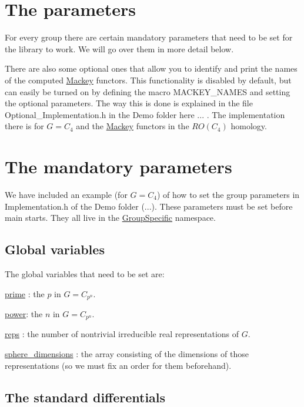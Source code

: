 \hypertarget{how_para}{}\section{The parameters}\label{how_para}

\begin{DoxyItemize}
\item For every group there are certain mandatory parameters that need to be set for the library to work. We will go over them in more detail below.
\item There are also some optional ones that allow you to identify and print the names of the computed \hyperlink{namespaceMackey}{Mackey} functors. This functionality is disabled by default, but can easily be turned on by defining the macro {\ttfamily M\+A\+C\+K\+E\+Y\+\_\+\+N\+A\+M\+ES} and setting the optional parameters. The way this is done is explained in the file Optional\+\_\+\+Implementation.\+h in the Demo folder here ... . The implementation there is for $G=C_4$ and the \hyperlink{namespaceMackey}{Mackey} functors in the $RO(C_4)$ homology.
\end{DoxyItemize}\hypertarget{how_manda}{}\section{The mandatory parameters}\label{how_manda}
We have included an example (for $G=C_4$) of how to set the group parameters in Implementation.\+h of the Demo folder (...). These parameters must be set before {\ttfamily main} starts. They all live in the \hyperlink{namespaceGroupSpecific}{Group\+Specific} namespace.\hypertarget{how_var}{}\subsection{Global variables}\label{how_var}
The global variables that need to be set are\+:


\begin{DoxyItemize}
\item \hyperlink{classGroupSpecific_1_1Variables_a38586ec998bcbfdf325e6cfc6598b54b}{prime} \+: the $p$ in $G=C_{p^n}$.
\item \hyperlink{classGroupSpecific_1_1Variables_ac9bd6be19cc41e6877ee25a2d1c7be80}{power}\+: the $n$ in $G=C_{p^n}$.
\item \hyperlink{classGroupSpecific_1_1Variables_a5504789b0b60050e6ea223fdeb84874a}{reps} \+: the number of nontrivial irreducible real representations of $G$.
\item \hyperlink{classGroupSpecific_1_1Variables_a4746f16736abcf4c705dd8690ec12ca0}{sphere\+\_\+dimensions} \+: the array consisting of the dimensions of those representations (so we must fix an order for them beforehand).
\end{DoxyItemize}\hypertarget{how_fun}{}\subsection{The standard differentials}\label{how_fun}

